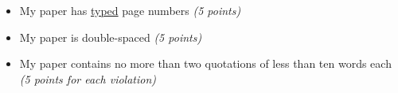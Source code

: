 \documentclass[11pt]{article}
\begin{document}
\vspace{0.5cm}

\begin{minipage}{0.135\textwidth}
\end{minipage}
\begin{minipage}{0.8\textwidth}
\hline\vspace{0.25cm}
\begin{itemize}\itemsep-0.25em
	\item My paper has \underline{typed} page numbers {\it (5 points)}
\end{itemize}	
\hline\vspace{0.25cm} 
\end{minipage}

\vspace{0.5cm}

\begin{minipage}{0.135\textwidth}
\end{minipage}
\begin{minipage}{0.8\textwidth}
\hline\vspace{0.25cm}
\begin{itemize}\itemsep-0.25em
	\item My paper is double-spaced {\it (5 points)}
\end{itemize}	
\hline\vspace{0.25cm} 
\end{minipage}

\vspace{0.5cm}

\begin{minipage}{0.135\textwidth}
\end{minipage}
\begin{minipage}{0.8\textwidth}
\hline\vspace{0.25cm}
\begin{itemize}\itemsep-0.25em
	\item My paper contains no more than two quotations of less than ten words each {\it (5 points for each violation)}
\end{itemize}	
\hline\vspace{0.25cm} 
\end{minipage}
\end{document}
